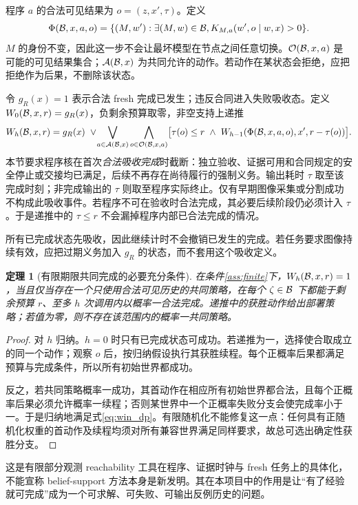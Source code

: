 \documentclass[11pt,a4paper,fontset=fandol]{ctexart}
\newtheorem{theorem}{定理}[section]
\theoremstyle{definition}
\theoremstyle{remark}\newtheorem{remark}[theorem]{说明}
\numberwithin{equation}{section}
\newcommand{\cA}{\mathcal A}\newcommand{\cQ}{\mathcal Q}\newcommand{\cF}{\mathcal F}
\begin{document}
程序 $a$ 的合法可见结果为 $o=(z,x',\tau)$。定义
\begin{equation}
 \Phi(\mathcal B,x,a,o)=\{(M,w'):\exists(M,w)\in\mathcal B,
 K_{M,a}(w',o\mid w,x)>0\}.
 \label{eq:phi}
\end{equation}
$M$ 的身份不变，因此这一步不会让最坏模型在节点之间任意切换。$\mathcal O(\mathcal B,x,a)$ 是可能的可见结果集合；$\cA(\cB,x)$ 为共同允许的动作。若动作在某状态会拒绝，应把拒绝作为后果，不删除该状态。

令 $g_R(x)=1$ 表示合法 fresh 完成已发生；违反合同进入失败吸收态。定义 $W_0(\mathcal B,x,r)=g_R(x)$，负剩余预算取零，非空支持上递推
\begin{align}
 W_h(\cB,x,r)=g_R(x)\ \vee\!
 \bigvee_{a\in\cA(\cB,x)}
 \bigwedge_{o\in\mathcal O(\cB,x,a)}
 \bigl[\tau(o)\le r\ \wedge\ W_{h-1}(\Phi(\cB,x,a,o),x',r-\tau(o))\bigr].
 \label{eq:win_dp}
\end{align}
本节要求程序核在首次\emph{合法吸收完成}时截断：独立验收、证据可用和合同规定的安全停止或交接均已满足，后续不再存在尚待履行的强制义务。输出耗时 $\tau$ 取至该完成时刻；非完成输出的 $\tau$ 则取至程序实际终止。仅有早期图像采集或分割成功不构成此吸收事件。若程序不可在验收时合法完成，其必要后续阶段仍必须计入 $\tau$。于是递推中的 $\tau\le r$ 不会漏掉程序内部已合法完成的情况。

所有已完成状态先吸收，因此继续计时不会撤销已发生的完成。若任务要求图像持续有效，应把过期义务加入 $g_R$ 的状态，而不套用这个吸收定义。

\begin{theorem}[有限期限共同完成的必要充分条件]
\label{thm:win}
在条件\ref{ass:finite}下，$W_h(\mathcal B,x,r)=1$，当且仅当存在一个只使用合法可见历史的共同策略，在每个 $\zeta\in\mathcal B$ 下都能于剩余预算 $r$、至多 $h$ 次调用内以概率一合法完成。递推中的获胜动作给出部署策略；若值为零，则不存在该范围内的概率一共同策略。
\end{theorem}
\begin{proof}
对 $h$ 归纳。$h=0$ 时只有已完成状态可成功。若递推为一，选择使合取成立的同一个动作；观察 $o$ 后，按归纳假设执行其获胜续程。每个正概率后果都满足预算与完成条件，所以所有初始世界都成功。

反之，若共同策略概率一成功，其首动作在相应所有初始世界都合法，且每个正概率后果必须允许概率一续程；否则某世界中一个正概率失败分支会使完成率小于一。于是归纳地满足式\eqref{eq:win_dp}。有限随机化不能修复这一点：任何具有正随机化权重的首动作及续程均须对所有兼容世界满足同样要求，故总可选出确定性获胜分支。
\end{proof}

这是有限部分观测 reachability 工具在程序、证据时钟与 fresh 任务上的具体化，不能宣称 belief-support 方法本身是新发明\cite{qualitative}。其在本项目中的作用是让“有了经验就可完成”成为一个可求解、可失败、可输出反例历史的问题。
\end{document}
